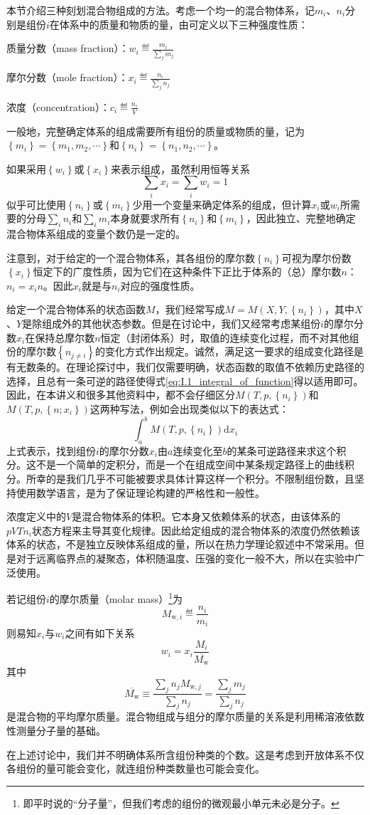 \documentclass[main.tex]{subfiles}
\begin{document}
本节介绍三种刻划混合物组成的方法。考虑一个均一的混合物体系，记$m_i$、$n_i$分别是组份$i$在体系中的质量和物质的量，由可定义以下三种强度性质：

质量分数（mass fraction）：$w_i\eqdef\frac{m_i}{\sum_jm_j}$

摩尔分数（mole fraction）：$x_i\eqdef\frac{n_i}{\sum_jn_j}$

浓度（concentration）：$c_i\eqdef\frac{n_i}{V}$

一般地，完整确定体系的组成需要所有组份的质量或物质的量，记为$\left\{m_i\right\}=\left\{m_1,m_2,\cdots\right\}$和$\left\{n_i\right\}=\left\{n_1,n_2,\cdots\right\}$。

如果采用$\left\{w_i\right\}$或$\left\{x_i\right\}$来表示组成，虽然利用恒等关系
\[\sum_ix_i=\sum_iw_i=1\]
似乎可比使用$\left\{n_i\right\}$或$\left\{m_i\right\}$少用一个变量来确定体系的组成，但计算$x_i$或$w_i$所需要的分母$\sum_in_i$和$\sum_im_i$本身就要求所有$\left\{n_i\right\}$和$\left\{m_i\right\}$，因此独立、完整地确定混合物体系组成的变量个数仍是一定的。

注意到，对于给定的一个混合物体系，其各组份的摩尔数$\left\{n_i\right\}$可视为摩尔份数$\left\{x_i\right\}$恒定下的广度性质，因为它们在这种条件下正比于体系的（总）摩尔数$n$：$n_i=x_in$。因此$x_i$就是与$n_i$对应的强度性质。

给定一个混合物体系的状态函数$M$，我们经常写成$M=M\left(X,Y,\left\{n_i\right\}\right)$，其中$X$、$Y$是除组成外的其他状态参数。但是在讨论中，我们又经常考虑某组份$i$的摩尔分数$x_i$在保持总摩尔数$n$恒定（封闭体系）时，取值的连续变化过程，而不对其他组份的摩尔数$\left\{n_{j\neq i}\right\}$的变化方式作出规定。诚然，满足这一要求的组成变化路径是有无数条的。在理论探讨中，我们仅需要明确，状态函数的取值不依赖历史路径的选择，且总有一条可逆的路径使得式\eqref{eq:I.1_integral_of_function}得以适用即可。因此，在本讲义和很多其他资料中，都不会仔细区分$M\left(T,p,\left\{n_i\right\}\right)$和$M\left(T,p,\left\{n;x_i\right\}\right)$这两种写法，例如会出现类似以下的表达式：
\[\int_a^bM\left(T,p,\left\{n_i\right\}\right)\mathrm{d}x_i\]
上式表示，找到组份$i$的摩尔分数$x_i$由$a$连续变化至$b$的某条可逆路径来求这个积分。这不是一个简单的定积分，而是一个在组成空间中某条规定路径上的曲线积分。所幸的是我们几乎不可能被要求具体计算这样一个积分。不限制组份数，且坚持使用数学语言，是为了保证理论构建的严格性和一般性。

浓度定义中的$V$是混合物体系的体积。它本身又依赖体系的状态，由该体系的$pVTn_i$状态方程来主导其变化规律。因此给定组成的混合物体系的浓度仍然依赖该体系的状态，不是独立反映体系组成的量，所以在热力学理论叙述中不常采用。但是对于远离临界点的凝聚态，体积随温度、压强的变化一般不大，所以在实验中广泛使用。

若记组份$i$的摩尔质量（molar mass）\footnote{即平时说的“分子量”，但我们考虑的组份的微观最小单元未必是分子。}为
\[M_{\text{w},i}\eqdef\frac{n_i}{m_i}\]
则易知$x_i$与$w_i$之间有如下关系
\[w_i=x_i\frac{M_i}{\overline{M_\text{w}}}\]
其中
\[\overline{M_\text{w}}\equiv\frac{\sum_jn_jM_{\text{w},j}}{\sum_jn_j}=\frac{\sum_jm_j}{\sum_jn_j}\]
是混合物的平均摩尔质量。混合物组成与组分的摩尔质量的关系是利用稀溶液依数性测量分子量的基础。

在上述讨论中，我们并不明确体系所含组份种类的个数。这是考虑到开放体系不仅各组份的量可能会变化，就连组份种类数量也可能会变化。
\end{document}
